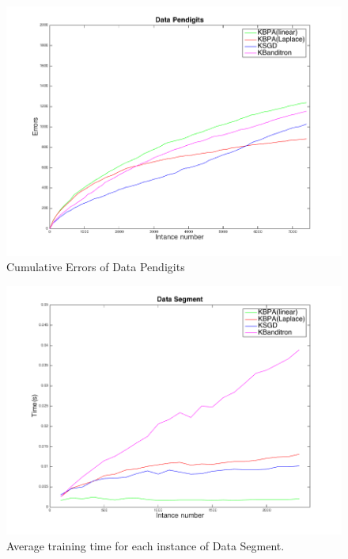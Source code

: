 \documentclass[twocolumn]{article}
\begin{document}
\begin{figure}[h!]
	\centerline{
		\includegraphics[width=\linewidth]{figs/Pendigits_kernel_CM.png}}
	\caption{Cumulative Errors of Data Pendigits}
	\label{pic:PKCM}
\end{figure}


\begin{figure}[h!]
	\centerline{
		\includegraphics[width=\linewidth]{figs/Segment_kernel_T.png}}
	\caption{Average training time for each instance of Data Segment.}
	\label{pic:SKT}
\end{figure}
\end{document}

